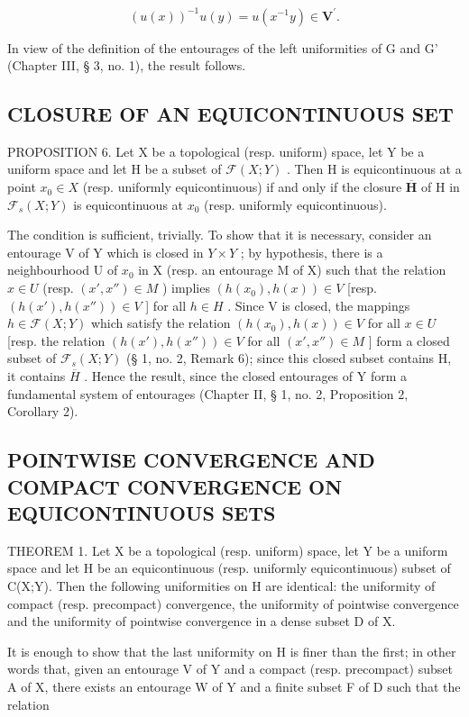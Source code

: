 \[
(u (x)) ^ {- 1} u (y) = u (x ^ {- 1} y) \in \mathbf {V} ^ {\prime}.
\]

In view of the definition of the entourages of the left uniformities of G and G' (Chapter III, § 3, no. 1), the result follows.

\subsection{CLOSURE OF AN EQUICONTINUOUS SET}

PROPOSITION 6. Let X be a topological (resp. uniform) space, let Y be a uniform space and let H be a subset of \(\mathcal{F}(X;Y)\) . Then H is equicontinuous at a point \(x_0 \in X\) (resp. uniformly equicontinuous) if and only if the closure \(\overline{\mathbf{H}}\) of H in \(\mathcal{F}_s(X;Y)\) is equicontinuous at \(x_0\) (resp. uniformly equicontinuous).

The condition is sufficient, trivially. To show that it is necessary, consider an entourage V of Y which is closed in \(Y \times Y\) ; by hypothesis, there is a neighbourhood U of \(x_{0}\) in X (resp. an entourage M of X) such that the relation \(x \in U\) (resp. \((x', x'') \in M\) ) implies \((h(x_{0}), h(x)) \in V\) {[}resp. \((h(x'), h(x'')) \in V\) {]} for all \(h \in H\) . Since V is closed, the mappings \(h \in \mathcal{F}(X; Y)\) which satisfy the relation \((h(x_{0}), h(x)) \in V\) for all \(x \in U\) {[}resp. the relation \((h(x'), h(x'')) \in V\) for all \((x', x'') \in M\) {]} form a closed subset of \(\mathcal{F}_{s}(X; Y)\) (§ 1, no. 2, Remark 6); since this closed subset contains H, it contains \(\overline{H}\) . Hence the result, since the closed entourages of Y form a fundamental system of entourages (Chapter II, § 1, no. 2, Proposition 2, Corollary 2).

\subsection{POINTWISE CONVERGENCE AND COMPACT CONVERGENCE ON EQUICONTINUOUS SETS}

THEOREM 1. Let X be a topological (resp. uniform) space, let Y be a uniform space and let H be an equicontinuous (resp. uniformly equicontinuous) subset of C(X;Y). Then the following uniformities on H are identical: the uniformity of compact (resp. precompact) convergence, the uniformity of pointwise convergence and the uniformity of pointwise convergence in a dense subset D of X.

It is enough to show that the last uniformity on H is finer than the first; in other words that, given an entourage V of Y and a compact (resp. precompact) subset A of X, there exists an entourage W of Y and a finite subset F of D such that the relation

